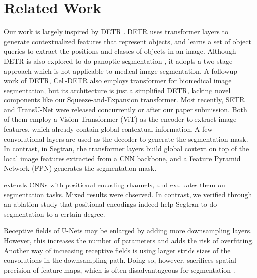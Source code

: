 \documentclass{article}
\begin{document}
\section{Related Work}
Our work is largely inspired by DETR \cite{detr}. DETR uses transformer layers to generate contextualized features that represent objects, and learns a set of object queries to extract the positions and classes of objects in an image. Although DETR is also explored to do panoptic segmentation \cite{panoptic}, it adopts a two-stage approach which is not applicable to medical image segmentation. A followup work of DETR, Cell-DETR \cite{cell-detr} also employs transformer for biomedical image segmentation, but its architecture is just a simplified DETR, lacking novel components like our Squeeze-and-Expansion transformer. Most recently, SETR \cite{SETR} and TransU-Net \cite{transunet} were released concurrently or after our paper submission. Both of them employ a Vision Transformer (ViT) \cite{vision-trans} as the encoder to extract image features, which already contain global contextual information. A few convolutional layers are used as the decoder to generate the segmentation mask. In contrast, in Segtran, the transformer layers build global context on top of the local image features extracted from a CNN backbone, and a Feature Pyramid Network (FPN) generates the segmentation mask.

\cite{add-pos-to-cnn} extends CNNs with positional encoding channels, and evaluates them on segmentation tasks. Mixed results were observed. In contrast, we verified through an ablation study that positional encodings indeed help Segtran to do segmentation to a certain degree.

Receptive fields of U-Nets may be enlarged by adding more downsampling layers. However, this increases the number of parameters and adds the risk of overfitting. Another way of increasing receptive fields is using larger stride sizes of the convolutions in the downsampling path. Doing so, however, sacrifices spatial precision of feature maps, which is often disadvantageous for segmentation \cite{coarse-features}.
\end{document}

